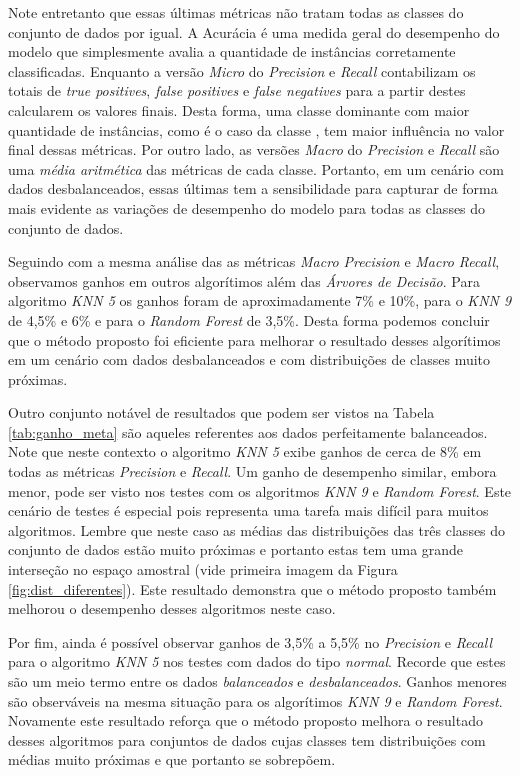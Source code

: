 Note entretanto que essas últimas métricas não tratam todas as classes do conjunto de dados por igual.
A Acurácia é uma medida geral do desempenho do modelo que simplesmente avalia a quantidade de instâncias corretamente classificadas.
Enquanto a versão \textit{Micro} do \textit{Precision} e \textit{Recall} contabilizam os totais de \textit{true positives}, \textit{false positives} e \textit{false negatives} para a partir destes calcularem os valores finais.
Desta forma, uma classe dominante com maior quantidade de instâncias, como é o caso da classe , tem maior influência no valor final dessas métricas.
Por outro lado, as versões \textit{Macro} do \textit{Precision} e \textit{Recall} são uma \textit{média aritmética} das métricas de cada classe.
Portanto, em um cenário com dados desbalanceados, essas últimas tem a sensibilidade para capturar de forma mais evidente as variações de desempenho do modelo para todas as classes do conjunto de dados.

Seguindo com a mesma análise das as métricas \textit{Macro Precision} e \textit{Macro Recall}, observamos ganhos em outros algorítimos além das \textit{Árvores de Decisão}.
Para algoritmo \textit{KNN 5} os ganhos foram de aproximadamente 7\% e 10\%, para o \textit{KNN 9} de 4,5\% e 6\% e para o \textit{Random Forest} de 3,5\%.
Desta forma podemos concluir que o método proposto foi eficiente para melhorar o resultado desses algorítimos em um cenário com dados desbalanceados e com distribuições de classes muito próximas.

Outro conjunto notável de resultados que podem ser vistos na Tabela \ref{tab:ganho_meta} são aqueles referentes aos dados perfeitamente balanceados.
Note que neste contexto o algoritmo \textit{KNN 5} exibe ganhos de cerca de 8\% em todas as métricas \textit{Precision} e \textit{Recall}.
Um ganho de desempenho similar, embora menor, pode ser visto nos testes com os algoritmos \textit{KNN 9} e \textit{Random Forest}.
Este cenário de testes é especial pois representa uma tarefa mais difícil para muitos algoritmos.
Lembre que neste caso as médias das distribuições das três classes do conjunto de dados estão muito próximas e portanto estas tem uma grande interseção no espaço amostral (vide primeira imagem da Figura \ref{fig:dist_diferentes}).
Este resultado demonstra que o método proposto também melhorou o desempenho desses algoritmos neste caso.

Por fim, ainda é possível observar ganhos de 3,5\% a 5,5\% no \textit{Precision} e \textit{Recall} para o algoritmo \textit{KNN 5} nos testes com dados do tipo \textit{normal}.
Recorde que estes são um meio termo entre os dados \textit{balanceados} e \textit{desbalanceados}.
Ganhos menores são observáveis na mesma situação para os algorítimos \textit{KNN 9} e \textit{Random Forest}.
Novamente este resultado reforça que o método proposto melhora o resultado desses algoritmos para conjuntos de dados cujas classes tem distribuições com médias muito próximas e que portanto se sobrepõem.

